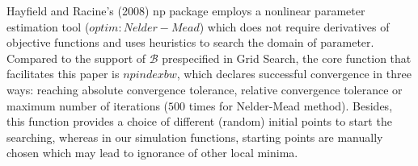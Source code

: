 \documentclass[a4paper]{article}
\begin{document}
Hayfield and Racine's (2008)  \cite{[28]} np package employs a nonlinear parameter estimation tool ($optim: Nelder-Mead$) which does not require derivatives of objective functions and uses heuristics to search the domain of parameter. Compared to the support of $\mathcal{B}$ prespecified in Grid Search, the core function that facilitates this paper is $npindexbw$, which declares successful convergence in three ways: reaching absolute convergence tolerance, relative convergence tolerance or maximum number of iterations ($500$ times for Nelder-Mead method). Besides, this function provides a choice of different (random) initial points to start the searching, whereas in our simulation functions, starting points are manually chosen which may lead to ignorance of other local minima.
\end{document}

